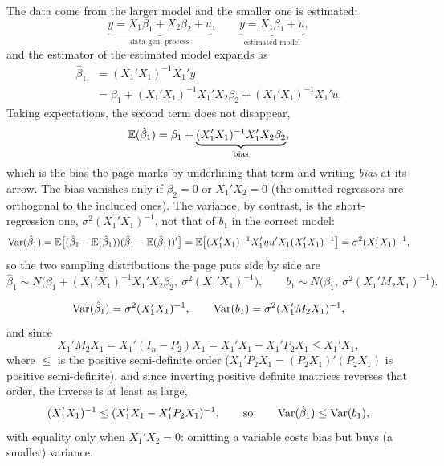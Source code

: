 \documentclass[11pt]{article}
\begin{document}
The data come from the larger model and the smaller one is estimated:
\[ \underbrace{y = X_{1}\beta_{1} + X_{2}\beta_{2} + u}_{\text{data gen.\ process}},
   \qquad
   \underbrace{y = X_{1}\beta_{1} + u}_{\text{estimated model}}, \]
and the estimator of the estimated model expands as
\[
\begin{aligned}
\hat{\beta}_{1} &= (X_{1}'X_{1})^{-1}X_{1}'y\\
            &= \beta_{1} + (X_{1}'X_{1})^{-1}X_{1}'X_{2}\beta_{2}
               + (X_{1}'X_{1})^{-1}X_{1}'u .
\end{aligned}
\]
Taking expectations, the second term does not disappear,
\[ \mathbb{E}(\hat{\beta}_{1}) = \beta_{1}
   + \underbrace{(X_{1}'X_{1})^{-1}X_{1}'X_{2}\beta_{2}}_{\text{bias}}, \]
which is the bias the page marks by underlining that term and writing \emph{bias}
at its arrow. The bias vanishes only if $\beta_{2} = 0$ or $X_{1}'X_{2} = 0$ (the
omitted regressors are orthogonal to the included ones). The variance, by contrast,
is the short-regression one, $\sigma^{2}(X_{1}'X_{1})^{-1}$, not that of $b_{1}$ in
the correct model:
\[
\operatorname{Var}(\hat{\beta}_{1})
  = \mathbb{E}\bigl[(\hat{\beta}_{1} - \mathbb{E}(\hat{\beta}_{1}))(\hat{\beta}_{1} - \mathbb{E}(\hat{\beta}_{1}))'\bigr]
  = \mathbb{E}\bigl[(X_{1}'X_{1})^{-1}X_{1}'uu'X_{1}(X_{1}'X_{1})^{-1}\bigr]
  = \sigma^{2}(X_{1}'X_{1})^{-1},
\]
so the two sampling distributions the page puts side by side are
\[ \hat{\beta}_{1} \sim N\bigl(\beta_{1} + (X_{1}'X_{1})^{-1}X_{1}'X_{2}\beta_{2},\
   \sigma^{2}(X_{1}'X_{1})^{-1}\bigr), \qquad
   b_{1} \sim N\bigl(\beta_{1},\ \sigma^{2}(X_{1}'M_{2}X_{1})^{-1}\bigr). \]

\[ \operatorname{Var}(\hat{\beta}_{1}) = \sigma^{2}(X_{1}'X_{1})^{-1}, \qquad
   \operatorname{Var}(b_{1}) = \sigma^{2}(X_{1}'M_{2}X_{1})^{-1}, \]
and since
\[ X_{1}'M_{2}X_{1} = X_{1}'(I_{n} - P_{2})X_{1} = X_{1}'X_{1} - X_{1}'P_{2}X_{1}
   \le X_{1}'X_{1}, \]
where $\le$ is the positive semi-definite order ($X_{1}'P_{2}X_{1} = (P_{2}X_{1})'(P_{2}X_{1})$
is positive semi-definite), and since inverting positive definite matrices reverses
that order, the inverse is at least as large,
\[ (X_{1}'X_{1})^{-1} \le (X_{1}'X_{1} - X_{1}'P_{2}X_{1})^{-1},
   \qquad\text{so}\qquad \operatorname{Var}(\hat{\beta}_{1}) \le \operatorname{Var}(b_{1}), \]
with equality only when $X_{1}'X_{2} = 0$: omitting a variable costs bias but buys
(a smaller) variance.
\end{document}

